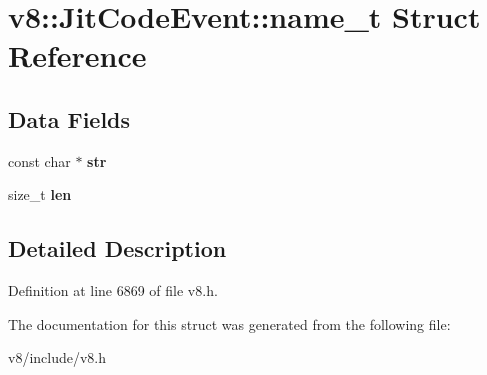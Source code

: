 \hypertarget{structv8_1_1JitCodeEvent_1_1name__t}{}\section{v8\+:\+:Jit\+Code\+Event\+:\+:name\+\_\+t Struct Reference}
\label{structv8_1_1JitCodeEvent_1_1name__t}
\subsection*{Data Fields}
\begin{DoxyCompactItemize}
\item 
\mbox{\label{structv8_1_1JitCodeEvent_1_1name__t_a344732b4289a6a1fd21bb577ac9eff15}} 
const char $\ast$ {\bfseries str}
\item 
\mbox{\label{structv8_1_1JitCodeEvent_1_1name__t_aa85ddd240f3b08c995caa8267ee8c586}} 
size\+\_\+t {\bfseries len}
\end{DoxyCompactItemize}


\subsection{Detailed Description}


Definition at line 6869 of file v8.\+h.



The documentation for this struct was generated from the following file\+:\begin{DoxyCompactItemize}
\item 
v8/include/v8.\+h\end{DoxyCompactItemize}

